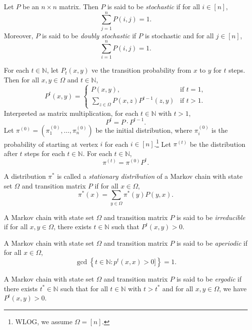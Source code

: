 \documentclass[letterpaper, reqno,11pt]{article}
\newcommand{\NN}{\mathbb{N}}
\begin{document}
\begin{definition}
  Let $P$ be an $n \times n$ matrix. Then $P$ is said to be \emph{stochastic} if for all $i \in [n]$,
  $$ \sum_{j = 1}^n P(i, j) = 1. $$
  Moreover, $P$ is said to be \emph{doubly stochastic} if $P$ is stochastic and for all $j \in [n]$,
  $$ \sum_{i = 1}^n P(i, j) = 1. $$
\end{definition}

For each $t \in \NN$, let $P_t(x, y)$ ve the transition probability from $x$ to $y$ for $t$ steps. Then for all $x, y \in \Omega$ and $t \in \NN$,
$$ P^t(x, y) = \left\{
  \begin{array}{ll}
    P(x, y), & \text{if $t = 1$}, \\
    \sum_{z \in \Omega} P(x, z) P^{t - 1}(z, y) & \text{if $t > 1$}.
  \end{array}
\right. $$
Interpreted as matrix multiplication, for each $t \in \NN$ with $t > 1$,
$$ P^t = P \cdot P^{t - 1}. $$
Let $\pi^{(0)} = (\pi_1^{(0)}, \ldots, \pi_n^{(0)})$ be the initial distribution, where $\pi_i^{(0)}$ is the probability of starting at vertex $i$ for each $i \in [n]$.\footnote{WLOG, we assume $\Omega = [n]$.} Let $\pi^{(t)}$ be the distribution after $t$ steps for each $t \in \NN$. For each $t \in \NN$,
$$ \pi^{(t)} = \pi^{(0)} P^t. $$

\begin{definition}
  A distribution $\pi^*$ is called a \emph{stationary distribution} of a Markov chain with state set $\Omega$ and transition matrix $P$ if for all $x \in \Omega$,
  $$ \pi^*(x) = \sum_{y \in \Omega} \pi^*(y) P(y, x). $$
\end{definition}

\begin{definition}
  A Markov chain with state set $\Omega$ and transition matrix $P$ is said to be \emph{irreducible} if for all $x, y \in \Omega$, there exists $t \in \NN$ such that $P^t(x, y) > 0$.
\end{definition}

\begin{definition}
  A Markov chain with state set $\Omega$ and transition matrix $P$ is said to be \emph{aperiodic} if for all $x \in \Omega$,
  $$ \gcd\left\{ t \in \NN : p^t(x, x) > 0 ]\right\} = 1. $$
\end{definition}

\begin{definition}
  A Markov chain with state set $\Omega$ and transition matrix $P$ is said to be \emph{ergodic} if there exists $t^* \in \NN$ such that for all $t \in \NN$ with $t > t^*$ and for all $x, y \in \Omega$, we have $P^t(x, y) > 0$.
\end{definition}
\end{document}

